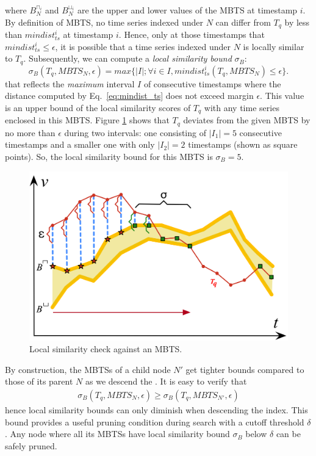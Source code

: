 \noindent where $B_{N}^{\sqcap_{i}}$ and $B_{N}^{\sqcup_{i}}$ are the upper and lower values of the MBTS at timestamp $i$. By definition of MBTS, no time series indexed under $N$ can differ from $T_q$ by less than $mindist_{ts}^i$ at timestamp $i$. Hence, only at those timestamps that $mindist_{ts}^i \leq \epsilon$, it is possible that a time series indexed under $N$ is locally similar to $T_q$. Subsequently, we can compute a {\em local similarity bound} $\sigma_B$:
\begin{equation}
\sigma_{B}(T_q, MBTS_N, \epsilon) = max\{|I|; \forall i \in I, mindist^i_{ts}(T_q, MBTS_N) \leq \epsilon\}.
\label{eq:sim_bound}
\end{equation}
\noindent that reflects the {\em maximum} interval $I$ of consecutive timestamps where the distance computed by Eq.~\ref{eq:mindist_ts} does not exceed margin $\epsilon$. 
This value is an upper bound of the local similarity scores of $T_q$ with any time series enclosed in this MBTS. Figure \ref{fig:sim_mbts} shows that $T_q$ deviates from the given MBTS by no more than $\epsilon$ during two intervals: one consisting of $|I_1|=5$ consecutive timestamps and a smaller one with only $|I_2|=2$ timestamps (shown as square points). So, the local similarity bound for this MBTS is $\sigma_{B}=5$.

\begin{figure}[tb]
    \centering
    \includegraphics{Figures/sim_mbts.png}
    \caption{Local similarity check against an MBTS.}
    \label{fig:sim_mbts}
\end{figure}

By construction, the MBTSs of a child node $N'$ get tighter bounds compared to those of its parent $N$ as we descend the \btsr. It is easy to verify that 
\begin{equation}
\begin{split}
\sigma_{B}(T_q, MBTS_N, \epsilon) \geq \sigma_{B}(T_q, MBTS_{N'}, \epsilon)
\end{split}
\label{eq:maxdur_ts}
\end{equation}
\noindent hence local similarity bounds can only diminish when descending the index. This bound provides a useful pruning condition during search with a cutoff threshold $\delta$. Any node where all its MBTSs have local similarity bound $\sigma_{B}$ below $\delta$ can be safely pruned.

